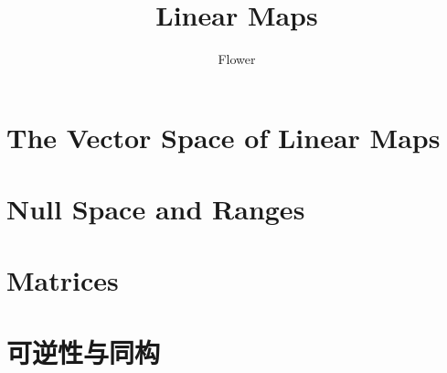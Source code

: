 \documentclass[
	12pt, %
]{fphw}
\title{Linear Maps} %
\author{Flower} %
\date{} %
\institute{University of Mars \\ Institute of Intergalactic Travel} %
\begin{document}
\maketitle %


\section{The Vector Space of Linear Maps}










\section{Null Space and Ranges}



\section{Matrices}

\section{可逆性与同构}

\end{document}
